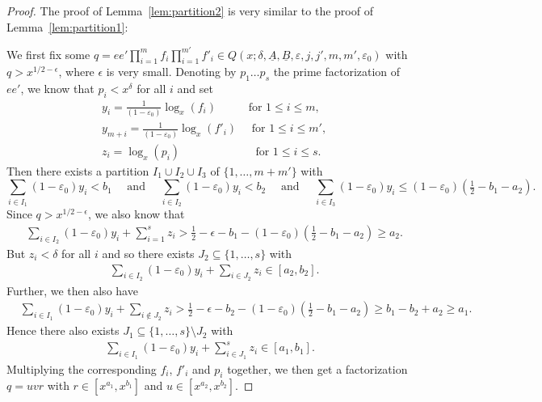 \documentclass{amsart}
\numberwithin{equation}{section}
\begin{document}
\begin{proof} The proof of Lemma~\ref{lem:partition2} is very similar to the proof of Lemma~\ref{lem:partition1}:

 We first fix some $q=e e' \prod_{i=1}^m f_i \prod_{i=1}^{m'} f'_i    \in  Q(x;\delta,\underline{A},\underline{B},\varepsilon,j,j',m,m',\varepsilon_0)$ with $q > x^{1/2-\epsilon}$, where $\epsilon$ is very small.  Denoting by $p_1 \dots p_s$   the prime factorization of $e e'$, we know that  $p_i <x^\delta$ for all $i$ and set
\begin{align*}
&y_i = \frac{1}{(1-\varepsilon_0)}  \log_x(f_i)  \qquad\,\,\, \mbox{ for } 1 \leq i \leq m, \\
 &y_{m+i} = \frac{1}{(1-\varepsilon_0)}   \log_x(f'_i)  \quad \mbox{ for } 1 \leq i \leq m', \\
 &z_i = \log_x(p_i)   \qquad \qquad \qquad \,\, \mbox{ for } 1 \leq i \leq s.
\end{align*} 
Then there exists a partition 
$I_1 \cup I_2 \cup I_3$ of $\{1, \dots, m+m'\}$ with 
$$ \sum_{i \in I_1} (1-\varepsilon_0) y_i   < b_1 \quad \mbox{ and } \quad  \sum_{i \in I_2} (1-\varepsilon_0) y_i   < b_2 \quad \mbox{ and } \quad \sum_{i \in I_3} (1-\varepsilon_0) y_i \leq  (1-\varepsilon_0) \left(\tfrac{1}{2} -b_1-a_2\right).$$
Since $q > x^{1/2-\epsilon}$, we also know that 
\begin{align*}
&\sum_{i \in I_2} (1-\varepsilon_0) y_i +  \sum_{i=1}^s z_i > \tfrac{1}{2}-\epsilon- b_1- (1-\varepsilon_0)\left(\tfrac{1}{2} -b_1 -a_2 \right) \geq    a_2.
 \end{align*} 
 But $z_i < \delta$ for all $i$  and so there exists $J_2 \subseteq \{1, \dots, s\}$ with  
 \begin{align*}
&\sum_{i \in I_2} (1-\varepsilon_0) y_i +  \sum_{i \in J_2} z_i \in [a_2,b_2].
 \end{align*} 
 Further,  we then also have  
 \begin{align*}
&\sum_{i \in I_1} (1-\varepsilon_0) y_i +  \sum_{i \not\in J_2} z_i > \tfrac{1}{2}-\epsilon- b_2-  (1-\varepsilon_0)\left(\tfrac{1}{2} -b_1 -a_2 \right) \geq  b_1  - b_2 +a_2 \geq  a_1.
\end{align*} 
Hence there also exists $J_1 \subseteq \{1, \dots, s\} \setminus J_2$ with 
\begin{align*}
 \sum_{i \in I_1} (1-\varepsilon_0) y_i +  \sum_{i \in J_1}^s z_i  \in [a_1,b_1].
\end{align*}
Multiplying the corresponding $f_i$, $f'_i$ and $p_i$ together, we then get a factorization $q=uvr$ with   $r \in  [x^{a_1}, x^{b_1}]$ and $u \in [x^{a_2},x^{b_2}]$. 
\end{proof}
\end{document}

